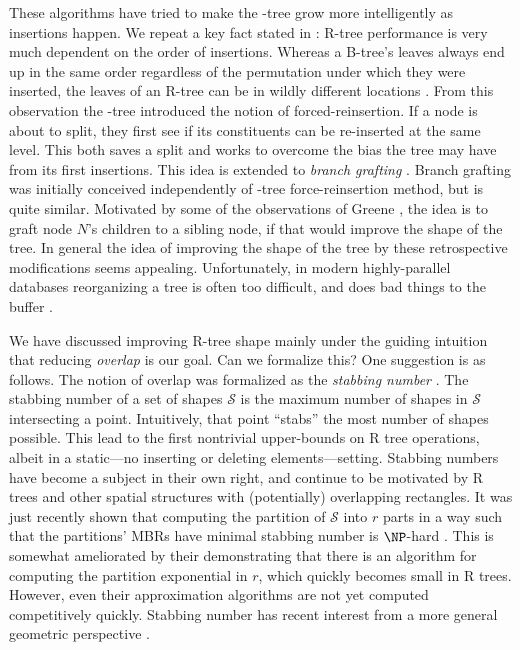 These algorithms have tried to make the \rbase-tree grow more intelligently as insertions happen.
We repeat a key fact stated in \cite{beckmannkriegelschneiderseeger90}: R-tree performance is very much dependent on the order of insertions.
Whereas a B-tree's leaves always end up in the same order regardless of the permutation under which they were inserted, the leaves of an R-tree can be in wildly different locations \cite{gaedegunther98,beckmannkriegelschneiderseeger90,argeberghaverkortyi04}.
From this observation the \rstar-tree \cite{beckmannkriegelschneiderseeger90} introduced the notion of forced-reinsertion.
If a node is about to split, they first see if its constituents can be re-inserted at the same level.
This both saves a split and works to overcome the bias the tree may have from its first insertions.
This idea is extended to \emph{branch grafting} \cite{schrekchen00}.
Branch grafting was initially conceived independently of \rstar-tree force-reinsertion method, but is quite similar.
Motivated by some of the observations of Greene \cite{greene89}, the idea is to graft node $N$'s children to a sibling node, if that would improve the shape of the tree.
In general the idea of improving the shape of the tree by these retrospective modifications seems appealing.
Unfortunately, in modern highly-parallel databases reorganizing a tree is often too difficult, and does bad things to the buffer \cite{beckmannseeger09}.

We have discussed improving R-tree shape mainly under the guiding intuition that reducing \emph{overlap} is our goal.
Can we formalize this?
One suggestion is as follows.
The notion of overlap was formalized as the \emph{stabbing number} \cite{berggudmundssonhammarovermars00}.
The stabbing number of a set of shapes $\mathcal S$ is the maximum number of shapes in $\mathcal S$ intersecting a point.
Intuitively, that point ``stabs'' the most number of shapes possible.
This lead to the first nontrivial upper-bounds on R tree operations, albeit in a static---no inserting or deleting elements---setting.
Stabbing numbers have become a subject in their own right, and continue to be motivated by R trees and other spatial structures with (potentially) overlapping rectangles.
It was just recently shown that computing the partition of $\mathcal S$ into $r$ parts in a way such that the partitions' MBRs have minimal stabbing number is $\NP$-hard \cite{bergkhosraviverdonschotweele11}.
This is somewhat ameliorated by their demonstrating that there is an algorithm for computing the partition exponential in $r$, which quickly becomes small in R trees.
However, even their approximation algorithms are not yet computed competitively quickly.
Stabbing number has recent interest from a more general geometric perspective \cite{durochermehrabi12}.

